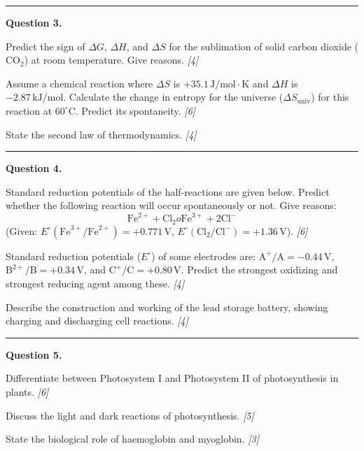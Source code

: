 \documentclass[11pt,a4paper]{article}
\newcommand{\pts}[1]{\hfill   \textit{[#1]}}
\begin{document}
\medskip\rule{\linewidth}{0.2pt}




\noindent   \textbf{Question 3.}

\begin{parts}
  \item Predict the sign of $\Delta G$, $\Delta H$, and $\Delta S$ for the sublimation of solid carbon dioxide ($ \text{CO}_2$) at room temperature. Give reasons. \pts{4}
  \item Assume a chemical reaction where $\Delta S$ is $+35.1\, \text{J/mol}\cdot \text{K}$ and $\Delta H$ is $-2.87\, \text{kJ/mol}$. Calculate the change in entropy for the universe ($\Delta S_{ \text{univ}}$) for this reaction at $60^\circ \text{C}$. Predict its spontaneity. \pts{6}
  \item State the second law of thermodynamics. \pts{4}
\end{parts}

\medskip\rule{\linewidth}{0.2pt}




\noindent   \textbf{Question 4.}

\begin{parts}
  \item Standard reduction potentials of the half-reactions are given below. Predict whether the following reaction will occur spontaneously or not. Give reasons:
    \[  \text{Fe}^{2+} +  \text{Cl}_2  o  \text{Fe}^{3+} + 2 \text{Cl}^- \]
    (Given: $E^\circ( \text{Fe}^{3+}/ \text{Fe}^{2+}) = +0.771\, \text{V}$, $E^\circ( \text{Cl}_2/ \text{Cl}^-) = +1.36\, \text{V}$). \pts{6}
  \item Standard reduction potentials ($E^\circ$) of some electrodes are: $ \text{A}^+/ \text{A} = -0.44\, \text{V}$, $ \text{B}^{2+}/ \text{B} = +0.34\, \text{V}$, and $ \text{C}^+/ \text{C} = +0.80\, \text{V}$. Predict the strongest oxidizing and strongest reducing agent among these. \pts{4}
  \item Describe the construction and working of the lead storage battery, showing charging and discharging cell reactions. \pts{4}
\end{parts}

\medskip\rule{\linewidth}{0.2pt}




\noindent   \textbf{Question 5.}

\begin{parts}
  \item Differentiate between Photosystem I and Photosystem II of photosynthesis in plants. \pts{6}
  \item Discuss the light and dark reactions of photosynthesis. \pts{5}
  \item State the biological role of haemoglobin and myoglobin. \pts{3}
\end{parts}
\end{document}
